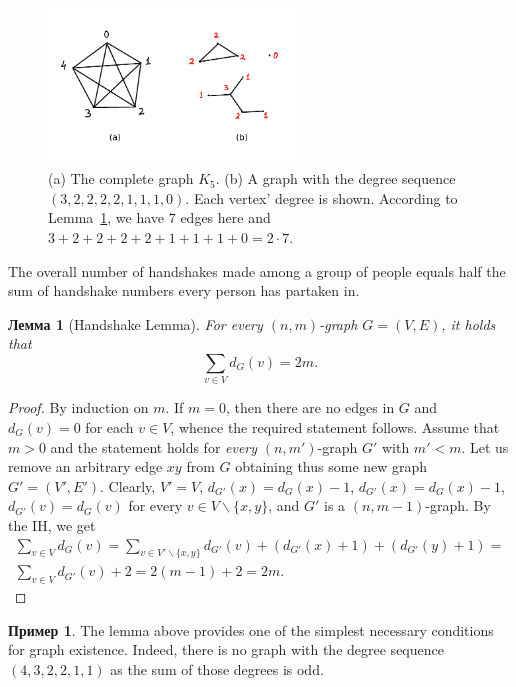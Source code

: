 \documentclass[12pt,notitlepage]{article}
\theoremstyle{plain}
\newtheorem{lemma}[thm]{Лемма}
\theoremstyle{definition}
\newtheorem{exm}[thm]{Пример}
\theoremstyle{plain}
\renewcommand{\setminus}{\smallsetminus}
\newcommand{\1}{\mathbf{1}}
\newcommand{\0}{\mathbf{0}}
\begin{document}
\begin{figure}[h]
	\centering
	\includegraphics*[width=0.6\textwidth]{graph_degrees.pdf}
	\caption{(a) The complete graph $K_5$. (b) A graph with the degree sequence $(3, 2, 2, 2, 2, 1, 1, 1, 0)$. Each vertex' degree is shown. According to Lemma~\ref{L14:l_handshake}, we have  $7$ edges here and $3 + 2 + 2 + 2 + 2 + 1 + 1 + 1 + 0 = 2 \cdot 7$.}
\end{figure}

The overall number of handshakes made among a group of people equals half the sum of handshake numbers every person has partaken in.
\begin{lemma}[Handshake Lemma]\label{L14:l_handshake}
	For every $(n,m)$-graph $G = (V, E)$, it holds that $$\sum_{v \in V} d_G(v) = 2 m.$$
\end{lemma}
\begin{proof}
	By induction on $m$. If $m = 0$, then there are no edges in $G$ and $d_G(v) = 0$ for each $v \in V$, whence the required statement follows. Assume that $m > 0$ and the statement holds for \emph{every} $(n,m')$-graph $G'$ with $m' < m$. Let us remove an arbitrary edge $x y$ from $G$ obtaining thus some new graph $G' = (V', E')$. Clearly, $V' = V$, $d_{G'}(x) = d_G(x) - 1$,  $d_{G'}(x) = d_G(x) - 1$, $d_{G'}(v) = d_G(v)$ for every $v \in V \setminus \{x, y\}$, and $G'$ is a $(n,m-1)$-graph. By the IH, we get
	\begin{multline*}
		\sum_{v \in V} d_G(v) = \sum_{v \in V' \setminus \{x, y \}} d_{G'}(v) + (d_{G'}(x) + 1) + (d_{G'}(y) + 1) =\\
		\sum_{v \in V} d_{G'}(v) + 2 = 2(m-1) + 2 = 2m. 
	\end{multline*}
	
\end{proof}

\begin{exm}
	The lemma above provides one of the simplest necessary conditions for graph existence. Indeed, there is no graph with the degree sequence $(4,3,2,2,1,1)$ as the sum of those degrees is odd.
\end{exm}
\end{document}
